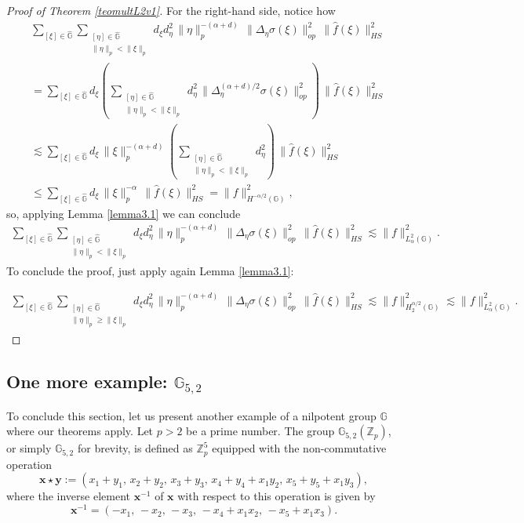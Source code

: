 \documentclass[12pt, reqno]{amsart}
\newcommand{\1}{\mathds{1}}
\newcommand{\G}{\mathbb{G}}
\begin{document}
\begin{proof}[Proof of Theorem \ref{teomultL2v1}]
For the right-hand side, notice how
\begin{align*}
&\sum_{[\xi]\in \widehat{\mathbb{G}}}
\sum_{\substack{[\eta]\in \widehat{\mathbb{G}} \\ \|\eta\|_p < \|\xi\|_p}}
d_\xi d_\eta^2\,\|\eta\|_p^{-(\alpha+d)}\,
\|\Delta_\eta \sigma(\xi)\|^2_{op}\,\|\hat{f}(\xi)\|^2_{HS} \\
&= \sum_{[\xi]\in \widehat{\mathbb{G}}}
d_\xi
\left( \sum_{\substack{[\eta]\in \widehat{\mathbb{G}}\\ \|\eta\|_p<\|\xi\|_p}}
d_\eta^2\,
\|\Delta^{(\alpha+d)/2}_\eta \sigma(\xi)\|^2_{op}\right)\,
\|\hat{f}(\xi)\|^2_{HS} \\
&\lesssim \sum_{[\xi]\in \widehat{\mathbb{G}}}
d_\xi \,\|\xi\|^{-(\alpha+d)}_p
\left( \sum_{\substack{[\eta]\in \widehat{\mathbb{G}}\\ \|\eta\|_p<\|\xi\|_p}}
d_\eta^2\right)\,
\|\hat{f}(\xi)\|^2_{HS} \\
&\leq \sum_{[\xi]\in \widehat{\mathbb{G}}}
d_\xi \,\|\xi\|^{-\alpha}_p\,\|\hat{f}(\xi)\|^2_{HS} = \|f\|^2_{H^{-\alpha/2}(\mathbb{G})},
\end{align*}
so, applying Lemma \ref{lemma3.1} we can conclude
\begin{align*}
\sum_{[\xi]\in \widehat{\mathbb{G}}}
\sum_{\substack{[\eta]\in \widehat{\mathbb{G}}\\ \|\eta\|_p<\|\xi\|_p}}
d_\xi d_\eta^2 \,\|\eta\|_p^{-(\alpha+d)}\,
\|\Delta_\eta \sigma(\xi)\|^2_{op}\,\|\hat{f}(\xi)\|^2_{HS}
\lesssim \|f\|^2_{L^2_\alpha(\mathbb{G})}.
\end{align*}
To conclude the proof, just apply again Lemma \ref{lemma3.1}:

\begin{align*}
\sum_{[\xi]\in \widehat{\mathbb{G}}}
\sum_{\substack{[\eta]\in \widehat{\mathbb{G}}\\ \|\eta\|_p \geq \|\xi\|_p}}
d_\xi d_\eta^2 \,\|\eta\|_p^{-(\alpha+d)}\,
\|\Delta_\eta \sigma(\xi)\|^2_{op}\,\|\hat{f}(\xi)\|^2_{HS}
\lesssim \| f \|_{H^{\alpha/2}_2 (\G)}^2 \lesssim  \|f\|^2_{L^2_\alpha(\mathbb{G})}.
\end{align*}
\end{proof}

\subsection{One more example: $\G_{5,2}$}

To conclude this section, let us present another example of a nilpotent group $\G$ where our theorems apply. Let $p > 2$ be a prime number. The group $\mathbb{G}_{5,2}(\mathbb{Z}_p)$, or simply $\mathbb{G}_{5,2}$ for brevity, is defined as $\mathbb{Z}_p^5$ equipped with the non-commutative operation
\[
\mathbf{x} \star \mathbf{y} := \left(
x_1 + y_1,\,
x_2 + y_2,\,
x_3 + y_3,\,
x_4 + y_4 + x_1 y_2,\,
x_5 + y_5 + x_1 y_3
\right),
\]where the inverse element $\mathbf{x}^{-1}$ of $\mathbf{x}$ with respect to this operation is given by
\[
\mathbf{x}^{-1} = \left(
- x_1,\,
- x_2,\,
- x_3,\,
- x_4 + x_1 x_2,\,
- x_5 + x_1 x_3
\right).
\]
\end{document}

